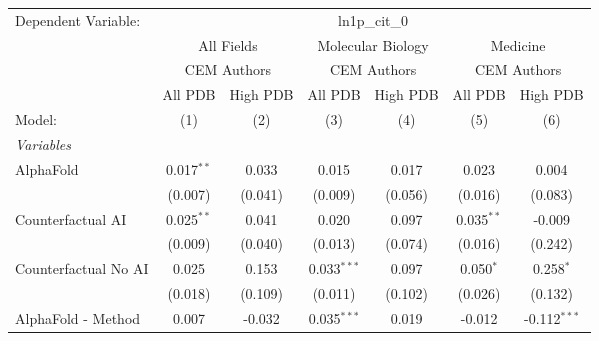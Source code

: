 \begingroup
\centering
\begin{tabular}{lcccccc}
   \tabularnewline \midrule \midrule
   Dependent Variable: & \multicolumn{6}{c}{ln1p\_cit\_0}\\
 & \multicolumn{2}{c}{All Fields} & \multicolumn{2}{c}{Molecular Biology} & \multicolumn{2}{c}{Medicine} \\
\cmidrule(lr){2-3} \cmidrule(lr){4-5} \cmidrule(lr){6-7}
 & \multicolumn{2}{c}{CEM Authors} & \multicolumn{2}{c}{CEM Authors} & \multicolumn{2}{c}{CEM Authors} \\
\cmidrule(lr){2-3} \cmidrule(lr){4-5} \cmidrule(lr){6-7}
 & \multicolumn{1}{c}{All PDB} & \multicolumn{1}{c}{High PDB} & \multicolumn{1}{c}{All PDB} & \multicolumn{1}{c}{High PDB} & \multicolumn{1}{c}{All PDB} & \multicolumn{1}{c}{High PDB} \\
\cmidrule(lr){2-2} \cmidrule(lr){3-3} \cmidrule(lr){4-4} \cmidrule(lr){5-5} \cmidrule(lr){6-6} \cmidrule(lr){7-7}
   Model:                                                     & (1)            & (2)           & (3)            & (4)     & (5)            & (6)\\  
   \midrule
   \emph{Variables}\\
   AlphaFold                                                  & 0.017$^{**}$   & 0.033         & 0.015          & 0.017   & 0.023          & 0.004\\   
                                                              & (0.007)        & (0.041)       & (0.009)        & (0.056) & (0.016)        & (0.083)\\   
   Counterfactual AI                                          & 0.025$^{**}$   & 0.041         & 0.020          & 0.097   & 0.035$^{**}$   & -0.009\\   
                                                              & (0.009)        & (0.040)       & (0.013)        & (0.074) & (0.016)        & (0.242)\\   
   Counterfactual No AI                                       & 0.025          & 0.153         & 0.033$^{***}$  & 0.097   & 0.050$^{*}$    & 0.258$^{*}$\\   
                                                              & (0.018)        & (0.109)       & (0.011)        & (0.102) & (0.026)        & (0.132)\\   
   AlphaFold - Method                                         & 0.007          & -0.032        & 0.035$^{***}$  & 0.019   & -0.012         & -0.112$^{***}$\\   

\end{tabular}
